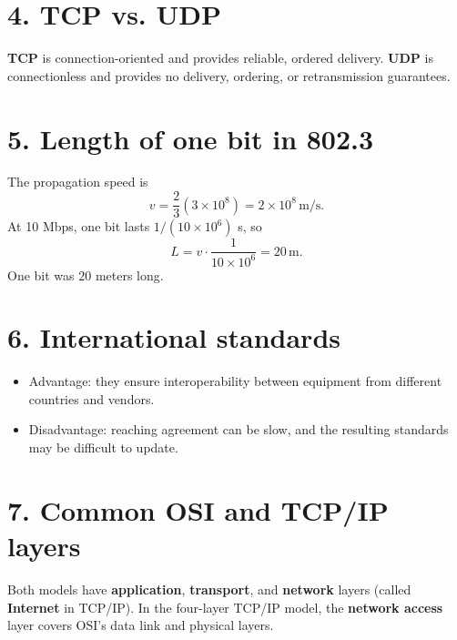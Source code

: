 \documentclass[11pt]{article}
\begin{document}
\section*{4. TCP vs. UDP}

\textbf{TCP} is connection-oriented and provides reliable, ordered delivery. \textbf{UDP} is connectionless and provides no delivery, ordering, or retransmission guarantees.

\section*{5. Length of one bit in 802.3}

The propagation speed is
\[
v=\frac{2}{3}(3\times10^8)=2\times10^8\,\mathrm{m/s}.
\]
At 10 Mbps, one bit lasts \(1/(10\times10^6)\) s, so
\[
L=v\cdot\frac{1}{10\times10^6}=20\,\mathrm{m}.
\]
One bit was \(20\) meters long.

\section*{6. International standards}

\begin{itemize}[leftmargin=*]
  \item Advantage: they ensure interoperability between equipment from different countries and vendors.
  \item Disadvantage: reaching agreement can be slow, and the resulting standards may be difficult to update.
\end{itemize}

\section*{7. Common OSI and TCP/IP layers}

Both models have \textbf{application}, \textbf{transport}, and \textbf{network} layers (called \textbf{Internet} in TCP/IP). In the four-layer TCP/IP model, the \textbf{network access} layer covers OSI's data link and physical layers.
\end{document}
